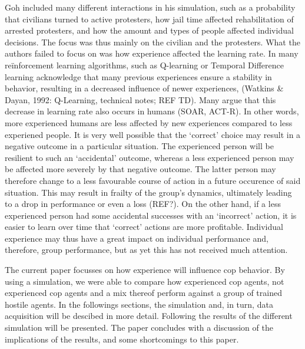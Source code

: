 Goh included many different interactions in his simulation, such as a probability that civilians turned to active protesters, how jail time affected rehabilitation of arrested protesters, and how the amount and types of people affected individual decisions. The focus was thus mainly on the civilian and the protesters. What the authors failed to focus on was how experience affected the learning rate. In many re\"inforcement learning algorithms, such as Q-learning or Temporal Difference learning acknowledge that many previous experiences ensure a stability in behavior, resulting in a decreased influence of newer experiences,  (Watkins \& Dayan, 1992: Q-Learning, technical notes; REF TD). Many argue that this decrease in learning rate also occurs in humans (SOAR, ACT-R). In other words, more experienced humans are less affected by new experiences compared to less experiened people. It is very well possible that the `correct' choice may result in a negative outcome in a particular situation. The experienced person will be resilient to such an `accidental' outcome, whereas a less experienced person may be affected more severely by that negative outcome. The latter person may therefore change to a less favourable course of action in a future occurence of said situation. This may result in frailty of the group's dynamics, ultimately leading to a drop in performance or even a loss (REF?). On the other hand, if a less experienced person had some accidental successes with an `incorrect' action, it is easier to learn over time that `correct' actions are more profitable. Individual experience may thus have a great impact on individual performance and, therefore, group performance, but as yet this has not received much attention. 

The current paper focusses on how experience will influence cop behavior. By using a simulation, we were able to compare how experienced cop agents, not experienced cop agents and a mix thereof perform against a group of trained hostile agents. In the followings sections, the simulation and, in turn, data acquisition will be descibed in more detail. Following the results of the different simulation will be presented. The paper concludes with a discussion of the implications of the results, and some shortcomings to this paper. 